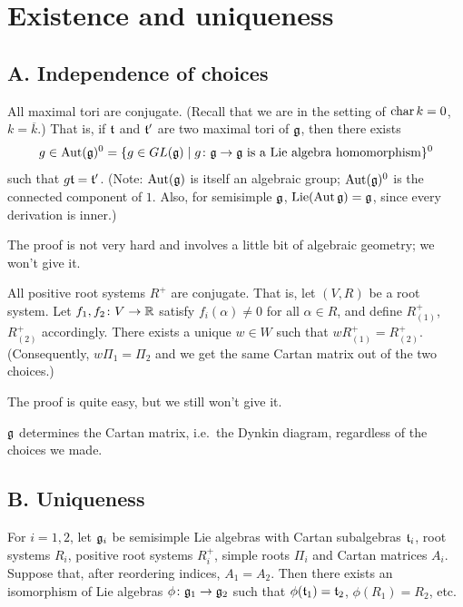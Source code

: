 \section{Existence and uniqueness}


\subsection*{A. Independence of choices}

\begin{theorem}
All maximal tori are conjugate. (Recall that we are in the setting of
$\operatorname{char} k = 0$, $k = \overline{k}$.) That is, if $\mathfrak{t}$ and $\mathfrak{t}'$ are two
maximal tori of $\mathfrak{g}$, then there exists
\[
  g \in \operatorname{Aut}(\mathfrak{g})^0 = \{g \in GL(\mathfrak{g}) \mid g\colon \mathfrak{g} \to \mathfrak{g} \text{ is a Lie algebra homomorphism}\}^0
\]
such that $g\mathfrak{t} = \mathfrak{t}'$. (Note: $\operatorname{Aut}(\mathfrak{g})$ is itself an algebraic group;
$\operatorname{Aut}(\mathfrak{g})^0$ is the connected component of $1$. Also, for semisimple $\mathfrak{g}$,
$\operatorname{Lie}(\operatorname{Aut} \mathfrak{g}) = \mathfrak{g}$, since every derivation is inner.)
\end{theorem}

The proof is not very hard and involves a little bit of algebraic geometry; we
won't give it.

\begin{theorem}
All positive root systems $R^+$ are conjugate. That is, let $(V, R)$ be a root
system. Let $f_1, f_2\colon V \to \mathbb{R}$ satisfy $f_i(\alpha) \neq 0$ for all
$\alpha \in R$, and define $R^+_{(1)}$, $R^+_{(2)}$ accordingly. There exists a
unique $w \in W$ such that $wR^+_{(1)} = R^+_{(2)}$. (Consequently,
$w\Pi_1 = \Pi_2$ and we get the same Cartan matrix out of the two choices.)
\end{theorem}

The proof is quite easy, but we still won't give it.

\begin{corollary}
$\mathfrak{g}$ determines the Cartan matrix, i.e.\ the Dynkin diagram, regardless of the
choices we made.
\end{corollary}

\subsection*{B. Uniqueness}

\begin{theorem}
For $i = 1, 2$, let $\mathfrak{g}_i$ be semisimple Lie algebras with Cartan subalgebras
$\mathfrak{t}_i$, root systems $R_i$, positive root systems $R_i^+$, simple roots
$\Pi_i$ and Cartan matrices $A_i$. Suppose that, after reordering indices,
$A_1 = A_2$. Then there exists an isomorphism of Lie algebras
$\phi\colon \mathfrak{g}_1 \to \mathfrak{g}_2$ such that $\phi(\mathfrak{t}_1) = \mathfrak{t}_2$,
$\phi(R_1) = R_2$, etc.
\end{theorem}

